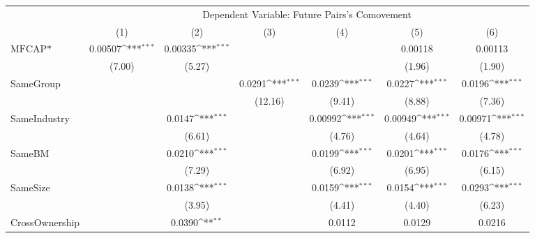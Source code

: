 {
\def\sym#1{\ifmmode^{#1}\else\(^{#1}\)\fi}
\begin{tabular}{l*{6}{c}}
\hline\hline
                    &\multicolumn{6}{c}{Dependent Variable:  Future Pairs's Comovement}                                                                 \\\cmidrule(lr){2-7}
                    &\multicolumn{1}{c}{(1)}         &\multicolumn{1}{c}{(2)}         &\multicolumn{1}{c}{(3)}         &\multicolumn{1}{c}{(4)}         &\multicolumn{1}{c}{(5)}         &\multicolumn{1}{c}{(6)}         \\
\hline
$ \text{MFCAP*} $   &     0.00507\sym{***}&     0.00335\sym{***}&                     &                     &     0.00118         &     0.00113         \\
                    &      (7.00)         &      (5.27)         &                     &                     &      (1.96)         &      (1.90)         \\
[1em]
SameGroup           &                     &                     &      0.0291\sym{***}&      0.0239\sym{***}&      0.0227\sym{***}&      0.0196\sym{***}\\
                    &                     &                     &     (12.16)         &      (9.41)         &      (8.88)         &      (7.36)         \\
[1em]
SameIndustry        &                     &      0.0147\sym{***}&                     &     0.00992\sym{***}&     0.00949\sym{***}&     0.00971\sym{***}\\
                    &                     &      (6.61)         &                     &      (4.76)         &      (4.64)         &      (4.78)         \\
[1em]
SameBM              &                     &      0.0210\sym{***}&                     &      0.0199\sym{***}&      0.0201\sym{***}&      0.0176\sym{***}\\
                    &                     &      (7.29)         &                     &      (6.92)         &      (6.95)         &      (6.15)         \\
[1em]
SameSize            &                     &      0.0138\sym{***}&                     &      0.0159\sym{***}&      0.0154\sym{***}&      0.0293\sym{***}\\
                    &                     &      (3.95)         &                     &      (4.41)         &      (4.40)         &      (6.23)         \\
[1em]
CrossOwnership      &                     &      0.0390\sym{**} &                     &      0.0112         &      0.0129         &      0.0216         \\

\end{tabular}}
